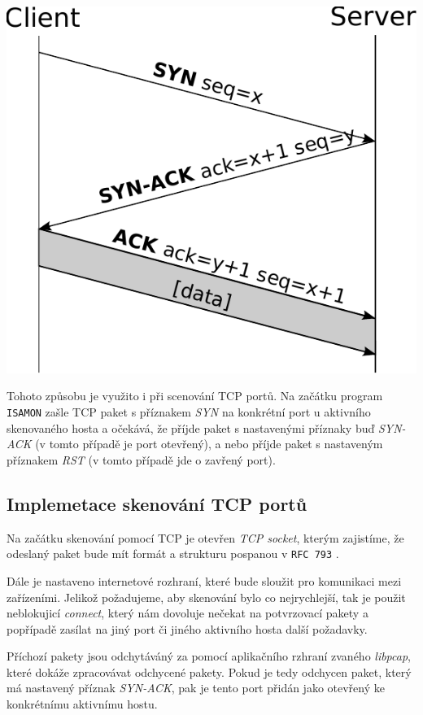 \includegraphics{obrazky-figures/Tcp-handshake.pdf}

Tohoto způsobu je využito i při scenování TCP portů. Na začátku program \texttt{ISAMON} zašle TCP paket s příznakem \textit{SYN} na konkrétní port u aktivního skenovaného hosta a očekává, že příjde paket s nastavenými příznaky buď \textit{SYN-ACK} (v tomto případě je port otevřený), a nebo příjde paket s nastaveným příznakem \textit{RST} (v tomto případě jde o zavřený port).

\subsection{Implemetace skenování TCP portů}
 Na začátku skenování pomocí TCP je otevřen \textit{TCP socket}, kterým zajistíme, že odeslaný paket bude mít formát a strukturu pospanou v \texttt{RFC 793} \cite{RFC793}. 
 
 Dále je nastaveno internetové rozhraní, které bude sloužit pro komunikaci mezi zařízeními. Jelikož požadujeme, aby skenování bylo co nejrychlejší, tak je použit neblokujicí \textit{connect}, který nám dovoluje nečekat na potvrzovací pakety a popřípadě zasílat na jiný port či jiného aktivního hosta další požadavky. 
 
 Příchozí pakety jsou odchytáváný za pomocí aplikačního rzhraní zvaného \textit{libpcap}, které dokáže zpracovávat odchycené pakety. Pokud je tedy odchycen paket, který má nastavený příznak \textit{SYN-ACK}, pak je tento port přidán jako otevřený ke konkrétnímu aktivnímu hostu.

